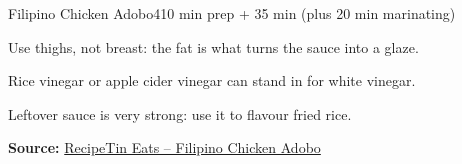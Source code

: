 \begin{recipebox}{Filipino Chicken Adobo}{4}{10 min prep + 35 min (plus 20 min marinating)}
\begin{notelist}
  \item Use thighs, not breast: the fat is what turns the sauce into a glaze.
  \item Rice vinegar or apple cider vinegar can stand in for white vinegar.
  \item Leftover sauce is very strong: use it to flavour fried rice.
\end{notelist}

\noindent\textbf{Source:} \href{https://www.recipetineats.com/filipino-chicken-adobo-flavour-kapow/}{RecipeTin Eats -- Filipino Chicken Adobo}

\end{recipebox}
